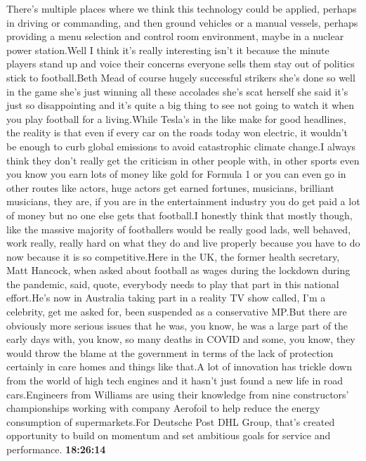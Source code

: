\documentclass{article}%
\begin{document}
There's multiple places where we think this technology could be applied, perhaps in driving or commanding, and then ground vehicles or a manual vessels, perhaps providing a menu selection and control room environment, maybe in a nuclear power station.Well I think it's really interesting isn't it because the minute players stand up and voice their concerns everyone sells them stay out of politics stick to football.Beth Mead of course hugely successful strikers she's done so well in the game she's just winning all these accolades she's scat herself she said it's just so disappointing and it's quite a big thing to see not going to watch it when you play football for a living.While Tesla's in the like make for good headlines, the reality is that even if every car on the roads today won electric, it wouldn't be enough to curb global emissions to avoid catastrophic climate change.I always think they don't really get the criticism in other people with, in other sports even you know you earn lots of money like gold for Formula 1 or you can even go in other routes like actors, huge actors get earned fortunes, musicians, brilliant musicians, they are, if you are in the entertainment industry you do get paid a lot of money but no one else gets that football.I honestly think that mostly though, like the massive majority of footballers would be really good lads, well behaved, work really, really hard on what they do and live properly because you have to do now because it is so competitive.Here in the UK, the former health secretary, Matt Hancock, when asked about football as wages during the lockdown during the pandemic, said, quote, everybody needs to play that part in this national effort.He's now in Australia taking part in a reality TV show called, I'm a celebrity, get me asked for, been suspended as a conservative MP.But there are obviously more serious issues that he was, you know, he was a large part of the early days with, you know, so many deaths in COVID and some, you know, they would throw the blame at the government in terms of the lack of protection certainly in care homes and things like that.A lot of innovation has trickle down from the world of high tech engines and it hasn't just found a new life in road cars.Engineers from Williams are using their knowledge from nine constructors' championships working with company Aerofoil to help reduce the energy consumption of supermarkets.For Deutsche Post DHL Group, that's created opportunity to build on momentum and set ambitious goals for service and performance.%
\textbf{18:26:14}%
\newline%
\end{document}
